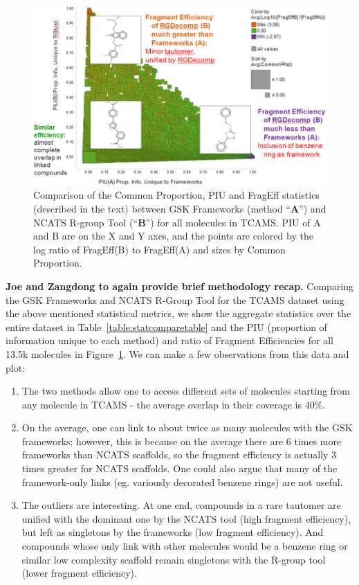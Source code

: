 \documentclass[journal=jacsat,manuscript=article]{achemso}
\newcommand*\fref[1]{Figure~\ref{fig:#1}}
\newcommand*\tref[1]{Table~\ref{table:#1}}
\begin{document}
\begin{figure}
\includegraphics[width=6in]{fig/statcompare_frames_RGtool.png}
\caption{Comparison of the Common Proportion, PIU and FragEff statistics (described in the text) between GSK Frameworks (method ``{\bf A}'') and NCATS R-group Tool (``{\bf B}'') for all molecules in TCAMS. PIU of A and B are on the X and Y axes, and the points are colored by the log ratio of FragEff(B) to FragEff(A) and sizes by Common Proportion.}
\label{fig:statcompare}
\end{figure}
 
\textbf{Joe and Zangdong to again provide brief methodology recap.}
Comparing the GSK Frameworks and NCATS R-Group Tool for the TCAMS dataset using the above mentioned statistical metrics, we show the aggregate statistics over the entire dataset in \tref{statcomparetable} and the PIU (proportion of information unique to each method) and ratio of Fragment Efficiencies for all 13.5k molecules in \fref{statcompare}. We can make a few observations from this data and plot:
\begin{enumerate} 
\item The two methods allow one to access different sets of molecules starting from any molecule in TCAMS - the average overlap in their coverage is 40\%.
\item On the average, one can link to about twice as many molecules with the GSK frameworks; however, this is because on the average there are 6 times more frameworks than NCATS scaffolds, so the fragment efficiency is actually 3 times greater for NCATS scaffolds. One could also argue that many of the framework-only links (eg. variously decorated benzene rings) are not useful.
\item The outliers are interesting. At one end, compounds in a rare tautomer are unified with the dominant one by the NCATS tool (high fragment efficiency), but left as singletons by the frameworks (low fragment efficiency). And compounds whose only link with other molecules would be a benzene ring or similar low complexity scaffold remain singletons with the R-group tool (lower fragment efficiency).
\end{enumerate}
\end{document}
